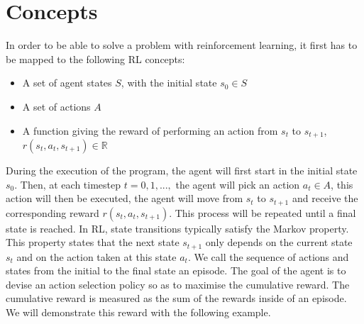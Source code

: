 \section{Concepts}
In order to be able to solve a problem with reinforcement learning, it first has to be mapped to the following RL concepts:
\begin{itemize}
	\item A set of agent states $S$, with the initial state $s_0\in S$
	\item A set of actions $A$
	\item A function giving the reward of performing an action from  $s_t$ to $s_{t+1}$, $r(s_t,a_t,s_{t+1})\in \mathbb{R}$
\end{itemize}
During the execution of the program, the agent will first start in the initial state $s_0$. Then, at each timestep $t=0,1,...,$ the agent will pick an action $a_t \in A$, this action will then be executed, the agent will move from $s_t$ to $s_{t+1}$ and receive the corresponding reward $r(s_t,a_t,s_{t+1})$. This process will be repeated until a final state is reached. In RL, state transitions typically satisfy the Markov property. This property states that the next state $s_{t+1}$ only depends on the current state $s_t$ and on the action taken at this state $a_t$. We call the sequence of actions and states from the initial to the final state an episode. The goal of the agent is to devise an action selection policy so as to maximise the cumulative reward. The cumulative reward is measured as the sum of the rewards inside of an episode. We will demonstrate this reward with the following example.

